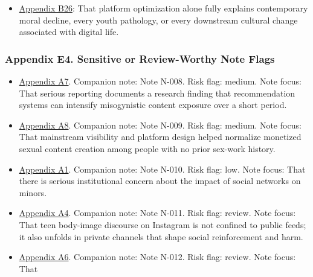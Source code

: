 \documentclass[
  american,
  11pt,
  letterpaper,
]{article}
\providecommand{\tightlist}{%
  \setlength{\itemsep}{0pt}\setlength{\parskip}{0pt}}
\begin{document}
\begin{itemize}
\tightlist
\item
  \hyperref[ch-02-appendix-b26-platform-optimization-alone-fully-explains-contemporary-moral-decline-every-yout]{Appendix
  B26}: That platform optimization alone fully explains contemporary
  moral decline, every youth pathology, or every downstream cultural
  change associated with digital life.
\end{itemize}

\subsubsection{Appendix E4. Sensitive or Review-Worthy Note
Flags}\label{ch-02-appendix-e4-sensitive-or-review-worthy-note-flags}

\begin{itemize}
\tightlist
\item
  \hyperref[ch-02-appendix-a7-social-media-algorithms-amplifying-misogynistic-content]{Appendix
  A7}. Companion note: Note N-008. Risk flag: medium. Note focus: That
  serious reporting documents a research finding that recommendation
  systems can intensify misogynistic content exposure over a short
  period.
\item
  \hyperref[ch-02-appendix-a8-nudes-shouldn-t-i-charge-for-these-motivations-of-new-sexual-content-creators-on-onlyfans]{Appendix
  A8}. Companion note: Note N-009. Risk flag: medium. Note focus: That
  mainstream visibility and platform design helped normalize monetized
  sexual content creation among people with no prior sex-work history.
\item
  \hyperref[ch-02-appendix-a1-social-media-and-youth-mental-health-the-u-s-surgeon-general-s-advisory]{Appendix
  A1}. Companion note: Note N-010. Risk flag: low. Note focus: That
  there is serious institutional concern about the impact of social
  networks on minors.
\item
  \hyperref[ch-02-appendix-a4-unfiltered-how-teens-engage-in-body-image-and-shaming-discussions-via-instagram-direct-messages-dms]{Appendix
  A4}. Companion note: Note N-011. Risk flag: review. Note focus: That
  teen body-image discourse on Instagram is not confined to public
  feeds; it also unfolds in private channels that shape social
  reinforcement and harm.
\item
  \hyperref[ch-02-appendix-a6-social-media-seen-as-mostly-good-for-democracy-across-many-nations-but-u-s-is-a-major-outlier]{Appendix
  A6}. Companion note: Note N-012. Risk flag: review. Note focus: That

\end{itemize}
\end{document}
